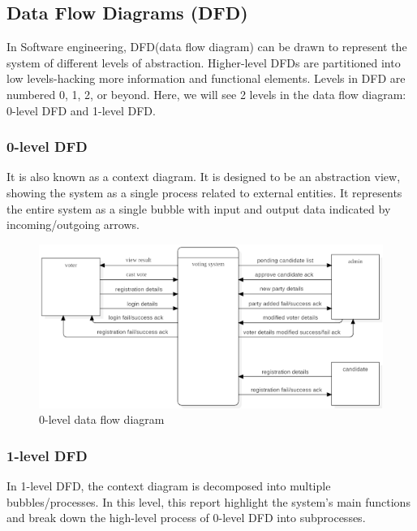 \subsection{Data Flow Diagrams (DFD)}
In Software engineering, DFD(data flow diagram) can be drawn to represent the system of different levels of abstraction. Higher-level DFDs are partitioned into low levels-hacking more information and functional elements. Levels in DFD are numbered 0, 1, 2, or beyond. Here, we will see 2 levels in the data flow diagram: 0-level DFD and 1-level DFD.

\subsubsection{0-level DFD}
It is also known as a context diagram. It is designed to be an abstraction view, showing the system as a single process related to external entities. It represents the entire system as a single bubble with input and output data indicated by incoming/outgoing arrows.

\begin{figure}[tbh] %
\begin{center}
	\includegraphics[width = 5.5in]{images/0-level data flow diagram.png}
	\caption{0-level data flow diagram} %
	\label{figSample1} %
\end{center}
\end{figure}

\subsubsection{1-level DFD}
In 1-level DFD, the context diagram is decomposed into multiple bubbles/processes. In this level, this report highlight the system's main functions and break down the high-level process of 0-level DFD into subprocesses.

